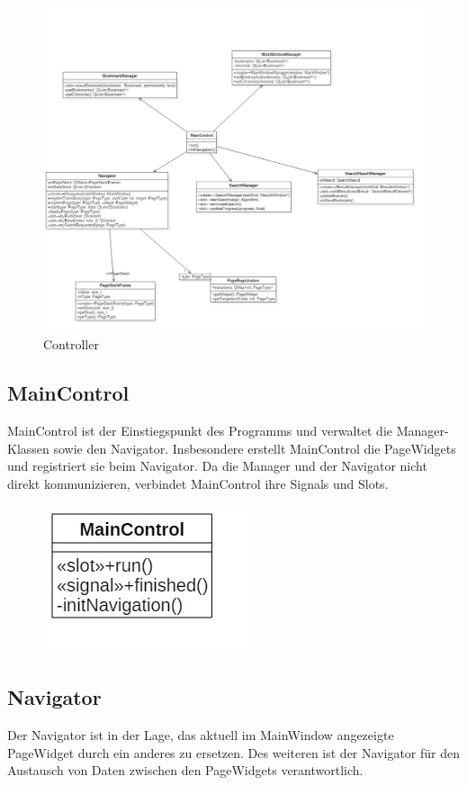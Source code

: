 \begin{figure}[H]
\includegraphics[width=1\linewidth]{img/Klassendiagramm/Controller}
\caption{Controller}
\label{fig:controller}
\end{figure}


\subsection*{MainControl}
MainControl ist der Einstiegspunkt des Programms und verwaltet die Manager-Klassen sowie den Navigator. Insbesondere erstellt MainControl die PageWidgets und registriert sie beim Navigator.
Da die Manager und der Navigator nicht direkt kommunizieren, verbindet MainControl ihre Signals und Slots.

\begin{figure}[H]
\centering
\includegraphics[scale=0.5]{img/Klassendiagramm/Klassen/MainControl}
\label{fig:mainControl}
\end{figure}

\subsection*{Navigator}
Der Navigator ist in der Lage, das aktuell im MainWindow angezeigte PageWidget durch ein anderes zu ersetzen. Des weiteren ist der Navigator für den Austausch von Daten zwischen den PageWidgets verantwortlich.

